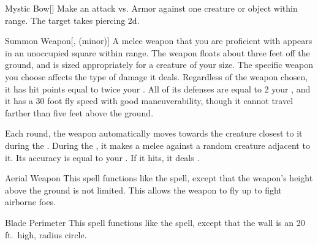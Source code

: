 \lowercase{\hypertarget{spell:Mystic Bow}{}}\label{spell:Mystic Bow}
\begin{ability}[\nth{1}]{\hypertarget{spell:Mystic Bow}{Mystic Bow}}[]
Make an attack vs. Armor against one creature or object within \rngmed range.
\hit The target takes piercing  \plus2d.
\end{ability}
\vspace{0.25em}



\lowercase{\hypertarget{spell:Summon Weapon}{}}\label{spell:Summon Weapon}
\begin{ability}[\nth{1}]{\hypertarget{spell:Summon Weapon}{Summon Weapon}}[,  (minor)]
A melee weapon that you are proficient with appears in an unoccupied square within \rngmed range.
The weapon floats about three feet off the ground, and is sized appropriately for a creature of your size.
The specific weapon you choose affects the type of damage it deals.
Regardless of the weapon chosen, it has hit points equal to twice your .
All of its defenses are equal to 2 \add your , and it has a 30 foot fly speed with good maneuverability, though it cannot travel farther than five feet above the ground.

Each round, the weapon automatically moves towards the creature closest to it during the .
During the , it makes a melee  against a random creature adjacent to it.
Its accuracy is equal to your .
If it hits, it deals .
\end{ability}
\vspace{0.25em}



\lowercase{\hypertarget{spell:Aerial Weapon}{}}\label{spell:Aerial Weapon}
\begin{ability}[\nth{2}]{\hypertarget{spell:Aerial Weapon}{Aerial Weapon}}
This spell functions like the  spell, except that the weapon's height above the ground is not limited.
This allows the weapon to fly up to fight airborne foes.
\end{ability}
\vspace{0.25em}



\lowercase{\hypertarget{spell:Blade Perimeter}{}}\label{spell:Blade Perimeter}
\begin{ability}[\nth{2}]{\hypertarget{spell:Blade Perimeter}{Blade Perimeter}}
This spell functions like the  spell, except that the wall is an 20 ft.\ high, \areamed radius circle.
\end{ability}
\vspace{0.25em}




